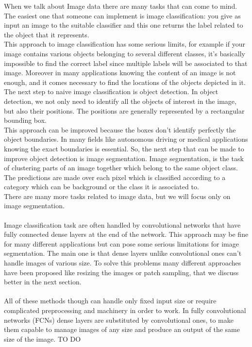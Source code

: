 \documentclass[10pt,twocolumn,letterpaper]{article}
\begin{document}
When we talk about Image data there are many tasks that can come to mind. The easiest one that someone can implement is image classification: you give as input an image to the suitable classifier and this one returns the label related to the object that it represents. \\
This approach to image classification has some serious limits, for example if your image contains various objects belonging to several different classes, it's basically impossible to find the correct label since multiple labels will be associated to that image. Moreover in many applications knowing the content of an image is not enough, and it comes necessary to find the locations of the objects depicted in it. \\
The next step to naive image classification is object detection. In object detection, we not only need to identify all the objects of interest in the image, but also their positions. The positions are generally represented by a rectangular bounding box. \\
This approach can be improved because the boxes don't identify perfectly the object boundaries. In many fields like autonomous driving or medical applications knowing the exact boundaries is essential.
So, the next step that can be made to improve object detection is image segmentation.
Image segmentation, is the task of clustering parts of an image together which belong to the same object class. The predictions are made over each pixel which is classified according to a category which can be background or the class it is associated to. \\
There are many more tasks related to image data, but we will focus only on image segmentation. \\ \\
Image classification task are often handled by convolutional networks that have fully connected dense layers at the end of the network. This approach may be fine for many different applications but can pose some serious limitations for image segmentation. The main one is that dense layers unlike convolutional ones can't handle images of various size. To solve this problems many different approaches have been proposed like resizing the images or patch sampling, that we discuss better in the next section. \\ \\
All of these methods though can handle only fixed input size or require complicated preprocessing and machinery in order to work. In fully convolutional networks (FCNs) dense layers are substituted by convolutional ones, to make them capable to manage images of any size and produce an output of the same size of the image. TO DO
\end{document}
